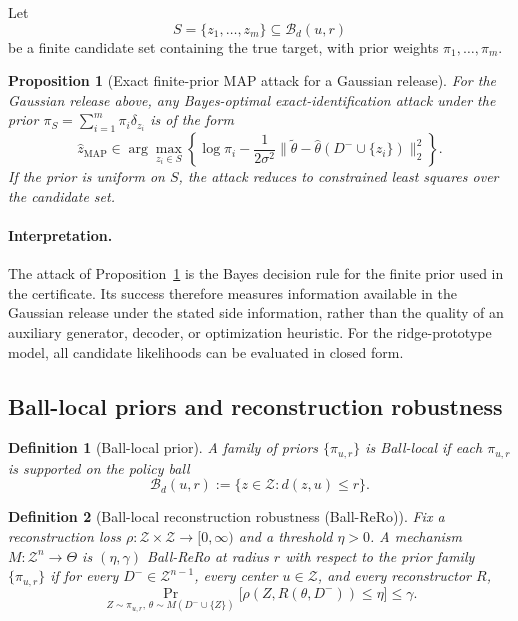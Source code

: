 \documentclass[conference,compsoc]{IEEEtran}
\newtheorem{definition}{Definition}
\newtheorem{proposition}{Proposition}
\newcommand{\ball}[2]{\mathcal{B}_{#1}(#2)}
\begin{document}
Let
\[
S=\{z_1,\dots,z_m\}\subseteq \ball{d}{u,r}
\]
be a finite candidate set containing the true target, with prior weights $\pi_1,\dots,\pi_m$.

\begin{proposition}[Exact finite-prior MAP attack for a Gaussian release]
\label{prop:finite-map}
For the Gaussian release above, any Bayes-optimal exact-identification attack under the prior $\pi_S=\sum_{i=1}^m \pi_i\delta_{z_i}$ is of the form
\[
\widehat z_{\mathrm{MAP}}
\in
\arg\max_{z_i\in S}
\left\{
\log \pi_i
-
\frac{1}{2\sigma^2}
\bigl\|
\widetilde\theta-\widehat\theta(D^-\cup\{z_i\})
\bigr\|_2^2
\right\}.
\]
If the prior is uniform on $S$, the attack reduces to constrained least squares over the candidate set.
\end{proposition}

\paragraph{Interpretation.}
The attack of Proposition~\ref{prop:finite-map} is the Bayes decision rule for the finite prior used in the certificate. Its success therefore measures information available in the Gaussian release under the stated side information, rather than the quality of an auxiliary generator, decoder, or optimization heuristic. For the ridge-prototype model, all candidate likelihoods can be evaluated in closed form.

\subsection{Ball-local priors and reconstruction robustness}

\begin{definition}[Ball-local prior]
A family of priors $\{\pi_{u,r}\}$ is \emph{Ball-local} if each $\pi_{u,r}$ is supported on the policy ball
\[
\ball{d}{u,r}:=\{z\in\mathcal{Z}: d(z,u)\le r\}.
\]
\end{definition}

\begin{definition}[Ball-local reconstruction robustness (Ball-ReRo)]
\label{def:ball-rero}
Fix a reconstruction loss $\rho:\mathcal{Z}\times\mathcal{Z}\to[0,\infty)$ and a threshold $\eta>0$. A mechanism $M:\mathcal{Z}^n\to\Theta$ is \emph{$(\eta,\gamma)$ Ball-ReRo at radius $r$} with respect to the prior family $\{\pi_{u,r}\}$ if for every $D^-\in\mathcal{Z}^{n-1}$, every center $u\in\mathcal{Z}$, and every reconstructor $R$,
\[
\Pr_{Z\sim\pi_{u,r},\,\theta\sim M(D^-\cup\{Z\})}
\big[\rho(Z,R(\theta,D^-))\le \eta\big]
\le \gamma.
\]
\end{definition}
\end{document}
